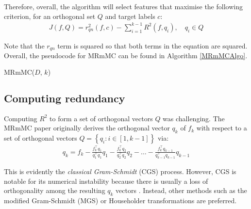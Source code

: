 \documentclass[12pt, twoside, a4paper]{report}
\begin{document}
Therefore, overall, the algorithm will select features that maximise the following criterion, for an orthogonal set $Q$ and target labels $c$:
\begin{align*}
J(f, Q) = r_{qn}^2(f, c)- \sum_{i=1}^{k-1} R^2(f, q_i), \quad q_i \in Q
\end{align*}

Note that the $r_{qn}$ term is squared so that both terms in the equation are squared. Overall, the pseudocode for MRmMC can be found in Algorithm \ref{MRmMCAlgo}.

\begin{algorithm}
\DontPrintSemicolon
{}
\BlankLine
{}
\caption{MRmMC($D$, $k$) \label{MRmMCAlgo}}
\end{algorithm}

\subsection{Computing redundancy} \label{mrmmc:redundancy:computation}

Computing $R^2$ to form a set of orthogonal vectors $Q$ was challenging. The MRmMC paper \cite{RefWorks:187} originally derives the orthogonal vector $q_k$ of $f_k$ with respect to a set of orthogonal vectors $Q = \left\lbrace q_i: i \in [1, k-1] \right\rbrace$ via:
\begin{align*}
q_k = f_k  - \frac{f_k^\top q_1}{q_1^\top q_1}q_1  - \frac{f_k^\top q_2}{q_2^\top q_2}q_2 - \dots - \frac{f_k^\top q_{k-1}}{q_{k-1}^\top q_{k-1}}q_{k-1}
\end{align*}

This is evidently the \textit{classical Gram-Schmidt} (CGS) process. However, CGS is notable for its numerical instability because there is usually a loss of orthogonality among the resulting $q_k$ vectors \cite{RefWorks:195}. Instead, other methods such as the modified Gram-Schmidt (MGS) or Householder transformations are preferred.
\end{document}
